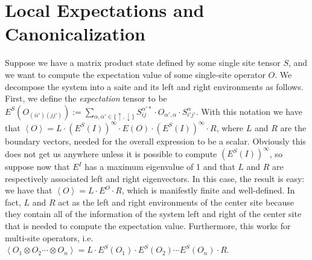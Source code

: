 \documentclass{article}
\newcommand{\paren}[1]{\left(#1\right)}
\newcommand{\seq}[1]{\left<#1\right>}
\newcommand{\tr}{\text{\textbf{tr}}\,}
\newcommand{\expect}[1]{\left<#1\right>}
\begin{document}

\section{Local Expectations and Canonicalization}

Suppose we have a matrix product state defined by some single site tensor $S$, and we want to compute the expectation value of some single-site operator $O$.  We decompose the system into a saite and its left and right environments as follows.  First, we define the \emph{expectation} tensor to be $E^S(O_{(ii')(jj')}):=\sum_{\alpha,\alpha'\in\{\uparrow,\downarrow\}}S^{\alpha'*}_{ij}\cdot O_{\alpha',\alpha}\cdot S^\alpha_{i'j'}.$  With this notation we have that $\expect{O}=L\cdot (E^S(I))^\infty\cdot E(O)\cdot(E^S(I))^\infty\cdot R$, where $L$ and $R$ are the boundary vectors, needed for the overall expression to be a scalar.  Obviously this does not get us anywhere unless it is possible to compute $(E^S(I))^\infty$, so suppose now that $E^I$ has a maximum eigenvalue of 1 and that $L$ and $R$ are respectively associated left and right eigenvectors.  In this case, the result is easy:  we have that $\expect{O}=L\cdot E^O\cdot R$, which is manifestly finite and well-defined.  In fact, $L$ and $R$ act as the left and right environments of the center site because they contain all of the information of the system left and right of the center site that is needed to compute the expectation value.  Furthermore, this works for multi-site operators, i.e. $\expect{O_1\otimes O_2\cdots\otimes O_n} = L\cdot E^S(O_1)\cdot E^S(O_2)\cdots E^S(O_n)\cdot R$.
\end{document}

